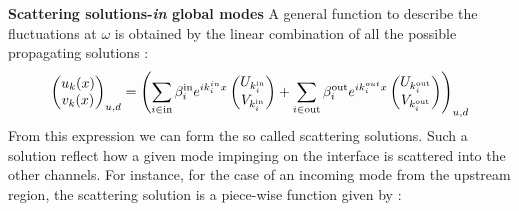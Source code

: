 \textbf{Scattering solutions-\textit{in} global modes}
A general function to describe the fluctuations at $\omega$ is obtained by the linear combination of all the possible propagating solutions :
\begin{equation}
    \begin{pmatrix}
        u_k(x) \\
        v_k(x)
    \end{pmatrix}_{u,d} = \left(\sum_{i\in \mathrm{in}}\beta^{\mathrm{in}}_i e^{ik^{in}_ix}\begin{pmatrix}
        U_{k^\mathrm{in}_i}  \\
        V_{k^\mathrm{in}_i}
    \end{pmatrix}+\sum_{i\in \mathrm{out}}\beta^{\mathrm{out}}_i e^{ik^{out}_ix}\begin{pmatrix}
        U_{k^\mathrm{out}_i}  \\
        V_{k^\mathrm{out}_i}
    \end{pmatrix}\right)_{u,d}
\end{equation}
From this expression we can form the so called scattering solutions. Such a solution reflect how a given mode impinging on the interface is scattered into the other channels.
For instance, for the case of an incoming mode from the upstream region, the scattering solution is a piece-wise function given by :
